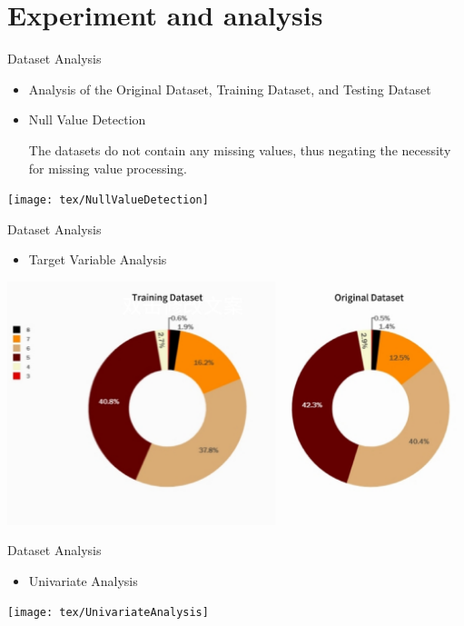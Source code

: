 \documentclass[
 size=14pt,
 paper=smartboard,  %
 mode=present, 		%
 display=slides, 	%
 style=tuliplab,  	%
 pauseslide,
 fleqn,leqno]{powerdot}
\begin{document}
\section{Experiment and analysis}
\begin{slide}{Dataset Analysis}
	\begin{itemize}
		\item Analysis of the Original Dataset, Training Dataset, and Testing Dataset
		\item Null Value Detection
		
		The datasets do not contain any missing values, thus negating the necessity for missing value processing.
	\end{itemize}
\begin{center}
	\texttt{[image: tex/NullValueDetection]}
\end{center}

\end{slide}


\begin{slide}[toc=]{Dataset Analysis}
	\begin{itemize}
		\item Target Variable Analysis
	\end{itemize}
\begin{center}
	\includegraphics[width=\textwidth]{tex/TargetVariableAnalysis}
\end{center}

\end{slide}


\begin{slide}[toc=]{Dataset Analysis}
	\begin{itemize}
		\item Univariate Analysis
	\end{itemize}
\begin{center}
	\texttt{[image: tex/UnivariateAnalysis]}
\end{center}
	
\end{slide}
\end{document}
